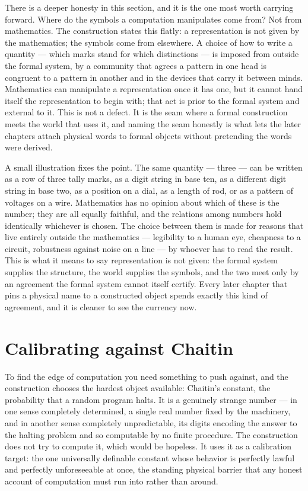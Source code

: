 There is a deeper honesty in this section, and it is the one most worth carrying forward. Where do the
symbols a computation manipulates come from? Not from mathematics. The construction states this
flatly: a representation is not given by the mathematics; the symbols come from elsewhere. A choice of
how to write a quantity --- which marks stand for which distinctions --- is imposed from outside the
formal system, by a community that agrees a pattern in one head is congruent to a pattern in another
and in the devices that carry it between minds. Mathematics can manipulate a representation once it has one, but it
cannot hand itself the representation to begin with; that act is prior to the formal system and
external to it. This is not a defect. It is the seam where a formal construction meets the world that
uses it, and naming the seam honestly is what lets the later chapters attach physical words to formal
objects without pretending the words were derived.

A small illustration fixes the point. The same quantity --- three --- can be written as a row of three
tally marks, as a digit string in base ten, as a different digit string in base two, as a position on
a dial, as a length of rod, or as a pattern of voltages on a wire. Mathematics has no opinion about
which of these is the number; they are all equally faithful, and the relations among numbers hold
identically whichever is chosen. The choice between them is made for reasons that live entirely outside
the mathematics --- legibility to a human eye, cheapness to a circuit, robustness against noise on a
line --- by whoever has to read the result. This is what it means to say representation is not given:
the formal system supplies the structure, the world supplies the symbols, and the two meet only by an
agreement the formal system cannot itself certify. Every later chapter that pins a physical name to a
constructed object spends exactly this kind of agreement, and it is cleaner to see the currency now.

\section{Calibrating against Chaitin}
\label{se:calibrating-against-chaitin}

To find the edge of computation you need something to push against, and the construction chooses the
hardest object available: Chaitin's constant, the probability that a random program halts. It is a
genuinely strange number --- in one sense completely determined, a single real number fixed by the
machinery, and in another sense completely unpredictable, its digits encoding the answer to the
halting problem and so computable by no finite procedure. The construction does not try to compute it,
which would be hopeless. It uses it as a calibration target: the one universally definable constant
whose behavior is perfectly lawful and perfectly unforeseeable at once, the standing physical barrier
that any honest account of computation must run into rather than around.

